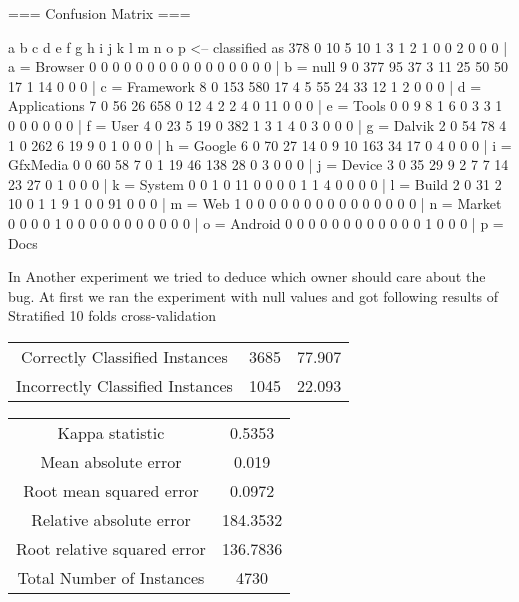 === Confusion Matrix ===

   a   b   c   d   e   f   g   h   i   j   k   l   m   n   o   p   <-- classified as
 378   0  10   5  10   1   3   1   2   1   0   0   2   0   0   0 |   a = Browser
   0   0   0   0   0   0   0   0   0   0   0   0   0   0   0   0 |   b = null
   9   0 377  95  37   3  11  25  50  50  17   1  14   0   0   0 |   c = Framework
   8   0 153 580  17   4   5  55  24  33  12   1   2   0   0   0 |   d = Applications
   7   0  56  26 658   0  12   4   2   2   4   0  11   0   0   0 |   e = Tools
   0   0   9   8   1   6   0   3   3   1   0   0   0   0   0   0 |   f = User
   4   0  23   5  19   0 382   1   3   1   4   0   3   0   0   0 |   g = Dalvik
   2   0  54  78   4   1   0 262   6  19   9   0   1   0   0   0 |   h = Google
   6   0  70  27  14   0   9  10 163  34  17   0   4   0   0   0 |   i = GfxMedia
   0   0  60  58   7   0   1  19  46 138  28   0   3   0   0   0 |   j = Device
   3   0  35  29   9   2   7   7  14  23  27   0   1   0   0   0 |   k = System
   0   0   1   0  11   0   0   0   0   1   1   4   0   0   0   0 |   l = Build
   2   0  31   2  10   0   1   1   9   1   0   0  91   0   0   0 |   m = Web
   1   0   0   0   0   0   0   0   0   0   0   0   0   0   0   0 |   n = Market
   0   0   0   0   1   0   0   0   0   0   0   0   0   0   0   0 |   o = Android
   0   0   0   0   0   0   0   0   0   0   0   0   1   0   0   0 |   p = Docs

    \item In Another experiment we tried to deduce which owner should care about the bug.
    At first we ran the experiment with null values and got following results of Stratified 10 folds cross-validation

\begin{tabular}{|c|c|c|}
Correctly Classified Instances      & 3685  &            77.907  \\
Incorrectly Classified Instances    & 1045  &            22.093  \\
\end{tabular}

\begin{tabular}{|c|c|}
Kappa statistic                &         0.5353\\
Mean absolute error            &         0.019 \\
Root mean squared error        &         0.0972\\
Relative absolute error        &       184.3532 \\
Root relative squared error    &       136.7836\\
Total Number of Instances      &      4730   \\
\end{tabular}





